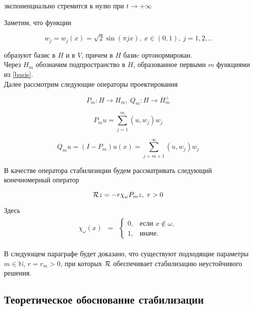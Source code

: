 экспоненциально стремится к нулю при $t \rightarrow + \infty$\\

\vspace{2em}

Заметим, что функции

\begin{equation}\label{basis}
    w_j = w_j(x) = \sqrt{2}\sin{(\pi j x)}, \ x \in (0, 1), \ j=1, 2, ..
\end{equation}

образуют базис в $H$ и в $V$, причем в $H$ базиc ортонормирован.\\
Через $H_m$ обозначим подпространство в $H$, образованное первыми $m$ функциями 
из \eqref{basis}.\\

Далее рассмотрим следующие операторы проектирования

$$P_m : H \rightarrow H_m, \ Q_m : H \rightarrow H_m^{\perp}$$

\begin{equation}
    P_m u = \sum \limits_{j=1}^{m} {(u, w_j) w_j}
\end{equation}

\begin{equation}
    Q_m u = (I - P_m)u(x) = \sum \limits_{j=m + 1}^{\infty} {(u, w_j) w_j}
\end{equation}

В качестве оператора стабилизиции будем рассматривать следующий конечномерный
оператор

$$\mathcal{R}{z} = -r\chi_{\omega}P_mz, \ r > 0$$

Здесь
\begin{gather*}
    \begin{matrix}
        \chi_{\omega}(x) & =
        & \left\{
        \begin{matrix}
            0, & \mbox{если } x \notin \omega, \\
            1, & \mbox{иначе. }
        \end{matrix} \right.
    \end{matrix}
\end{gather*}

В следующем параграфе будет доказано, что существуют подходящие параметры 
$m \in \mathbb{N}$, $r = r_m > 0$, при которых $\mathcal{R}{}$ обеспечивает 
стабилизацию неустойчивого решения.

\subsection{Теоретическое обоснование стабилизации}

